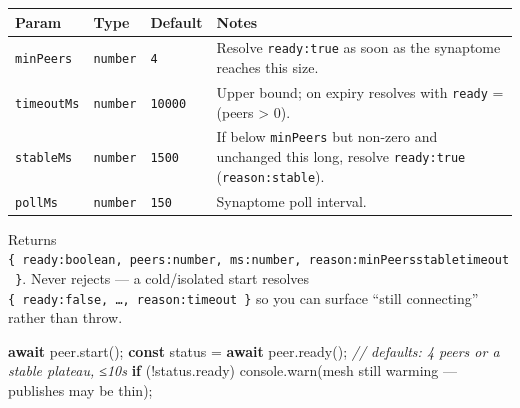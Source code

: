 \documentclass[
  nobib]{tufte-handout}
\newenvironment{Shaded}{}{}
\newcommand{\AttributeTok}[1]{\textcolor[rgb]{0.49,0.56,0.16}{#1}}
\newcommand{\BuiltInTok}[1]{\textcolor[rgb]{0.00,0.50,0.00}{#1}}
\newcommand{\CommentTok}[1]{\textcolor[rgb]{0.38,0.63,0.69}{\textit{#1}}}
\newcommand{\ControlFlowTok}[1]{\textcolor[rgb]{0.00,0.44,0.13}{\textbf{#1}}}
\newcommand{\FunctionTok}[1]{\textcolor[rgb]{0.02,0.16,0.49}{#1}}
\newcommand{\KeywordTok}[1]{\textcolor[rgb]{0.00,0.44,0.13}{\textbf{#1}}}
\newcommand{\NormalTok}[1]{#1}
\newcommand{\OperatorTok}[1]{\textcolor[rgb]{0.40,0.40,0.40}{#1}}
\newcommand{\StringTok}[1]{\textcolor[rgb]{0.25,0.44,0.63}{#1}}
\newcounter{none} %
\begin{document}
{\def\LTcaptype{none} %
\begin{longtable}[]{@{}
  >{\raggedright\arraybackslash}p{}
  >{\raggedright\arraybackslash}p{}
  >{\raggedright\arraybackslash}p{}
  >{\raggedright\arraybackslash}p{}@{}}
\toprule\noalign{}
\begin{minipage}[b]{\linewidth}\raggedright
Param
\end{minipage} & \begin{minipage}[b]{\linewidth}\raggedright
Type
\end{minipage} & \begin{minipage}[b]{\linewidth}\raggedright
Default
\end{minipage} & \begin{minipage}[b]{\linewidth}\raggedright
Notes
\end{minipage} \\
\midrule\noalign{}
\endhead
\bottomrule\noalign{}
\endlastfoot
\texttt{minPeers} & \texttt{number} & \texttt{4} & Resolve
\texttt{ready:true} as soon as the synaptome reaches this size. \\
\texttt{timeoutMs} & \texttt{number} & \texttt{10000} & Upper bound; on
expiry resolves with \texttt{ready} = (peers \textgreater{} 0). \\
\texttt{stableMs} & \texttt{number} & \texttt{1500} & If below
\texttt{minPeers} but non-zero and unchanged this long, resolve
\texttt{ready:true}
(\texttt{reason:\textquotesingle{}stable\textquotesingle{}}). \\
\texttt{pollMs} & \texttt{number} & \texttt{150} & Synaptome poll
interval. \\
\end{longtable}
}

Returns
\texttt{\{\ ready:boolean,\ peers:number,\ ms:number,\ reason:\textquotesingle{}minPeers\textquotesingle{}\textbar{}\textquotesingle{}stable\textquotesingle{}\textbar{}\textquotesingle{}timeout\textquotesingle{}\ \}}.
Never rejects --- a cold/isolated start resolves
\texttt{\{\ ready:false,\ …,\ reason:\textquotesingle{}timeout\textquotesingle{}\ \}}
so you can surface ``still connecting'' rather than throw.

\begin{Shaded}
\begin{Highlighting}[]
\ControlFlowTok{await}\NormalTok{ peer}\OperatorTok{.}\FunctionTok{start}\NormalTok{()}\OperatorTok{;}
\KeywordTok{const}\NormalTok{ status }\OperatorTok{=} \ControlFlowTok{await}\NormalTok{ peer}\OperatorTok{.}\FunctionTok{ready}\NormalTok{()}\OperatorTok{;}          \CommentTok{// defaults: 4 peers or a stable plateau, ≤10s}
\ControlFlowTok{if}\NormalTok{ (}\OperatorTok{!}\NormalTok{status}\OperatorTok{.}\AttributeTok{ready}\NormalTok{) }\BuiltInTok{console}\OperatorTok{.}\FunctionTok{warn}\NormalTok{(}\StringTok{\textquotesingle{}mesh still warming — publishes may be thin\textquotesingle{}}\NormalTok{)}\OperatorTok{;}
\end{Highlighting}
\end{Shaded}
\end{document}
